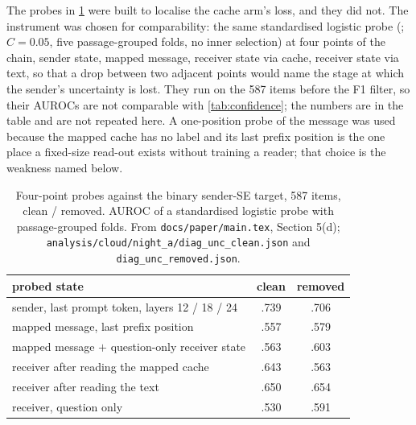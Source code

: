 \documentclass[11pt,a4paper]{report}
\newcommand{\SUGG}{\textcolor{suggc}{\textbf{\scriptsize[SUGGESTED]}}}
\newcommand{\msugg}{\marginnote{\SUGG}}
\begin{document}
\msugg The probes in \cref{tab:probes} were built to localise the cache arm's loss, and they did not. The instrument was chosen for comparability: the same standardised logistic probe (\citealp{kossen2024sep}; $C = 0.05$, five passage-grouped folds, no inner selection) at four points of the chain, sender state, mapped message, receiver state via cache, receiver state via text, so that a drop between two adjacent points would name the stage at which the sender's uncertainty is lost. They run on the 587 items before the F1 filter, so their AUROCs are not comparable with \cref{tab:confidence}; the numbers are in the table and are not repeated here. A one-position probe of the message was used because the mapped cache has no label and its last prefix position is the one place a fixed-size read-out exists without training a reader; that choice is the weakness named below.

\begin{table}[h]
\caption{Four-point probes against the binary sender-SE target, 587 items, clean / removed. AUROC of a standardised logistic probe with passage-grouped folds. From \texttt{docs/paper/main.tex}, Section 5(d); \texttt{analysis/cloud/night\_a/diag\_unc\_clean.json} and \texttt{diag\_unc\_removed.json}.}
\label{tab:probes}
\vskip 0.1in
\centering
\small
\begin{tabular}{lcc}
\toprule
probed state & clean & removed \\
\midrule
sender, last prompt token, layers 12 / 18 / 24 & .739 & .706 \\
mapped message, last prefix position & .557 & .579 \\
mapped message $+$ question-only receiver state & .563 & .603 \\
receiver after reading the mapped cache & .643 & .563 \\
receiver after reading the text & .650 & .654 \\
receiver, question only & .530 & .591 \\
\bottomrule
\end{tabular}
\end{table}
\end{document}
